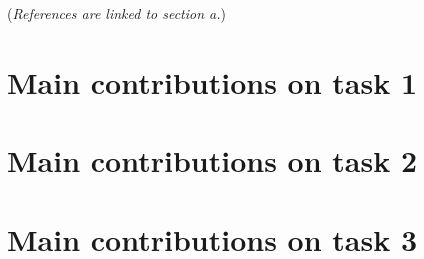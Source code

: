 \clearpage

 ({\it References are linked to section a.})
\begin{mdframed}[backgroundcolor=bgc]
\lipsum[1]
\end{mdframed}


\section*{Main contributions on task 1}
\lipsum[1]




\section*{Main contributions on task 2}
\lipsum[1]


\section*{Main contributions on task 3}
\lipsum[1]



